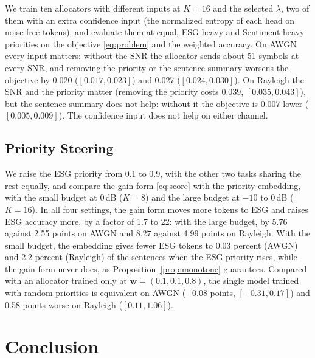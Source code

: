 We train ten allocators with different inputs at $K{=}16$ and the
selected $\lambda$, two of them with an extra confidence input (the
normalized entropy of each head on noise-free tokens), and evaluate
them at equal, ESG-heavy and Sentiment-heavy priorities on the
objective \eqref{eq:problem} and the weighted accuracy. On AWGN every
input matters: without the SNR the allocator sends about 51 symbols at
every SNR, and removing the priority or the sentence summary worsens
the objective by 0.020 ($[0.017, 0.023]$) and 0.027
($[0.024, 0.030]$). On Rayleigh the SNR and the priority matter
(removing the priority costs 0.039, $[0.035, 0.043]$), but the sentence
summary does not help: without it the objective is 0.007 lower
($[0.005, 0.009]$). The confidence input does not help on either
channel.

\subsection{Priority Steering}
\label{ssec:priority}

We raise the ESG priority from 0.1 to 0.9, with the other two tasks
sharing the rest equally, and compare the gain form \eqref{eq:score}
with the priority embedding, with the small budget at 0\,dB ($K{=}8$)
and the large budget at $-10$ to 0\,dB ($K{=}16$). In all four
settings, the gain form moves more tokens to ESG and raises ESG
accuracy more, by a factor of 1.7 to 22: with the large budget, by
5.76 against 2.55 points on AWGN and 8.27 against 4.99 points on
Rayleigh. With the small budget, the embedding gives fewer ESG tokens
to 0.03 percent (AWGN) and 2.2 percent (Rayleigh) of the sentences
when the ESG priority rises, while the gain form never does, as
Proposition~\ref{prop:monotone} guarantees. Compared with an allocator
trained only at $\mathbf{w} = (0.1, 0.1, 0.8)$, the single model
trained with random priorities is equivalent on AWGN ($-0.08$ points,
$[-0.31, 0.17]$) and 0.58 points worse on Rayleigh ($[0.11, 1.06]$).

\section{Conclusion}
\label{sec:conclusion}


